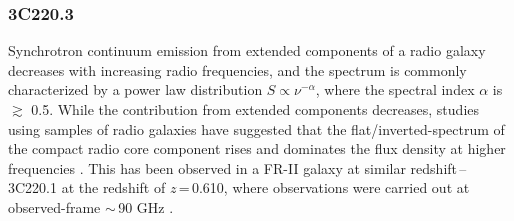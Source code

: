 \documentclass[twocolumn,apj,numberedappendix]{emulateapj}
\begin{document}
\subsubsection{3C220.3}\label{sec:SEDFg}
Synchrotron continuum emission from extended components of a radio galaxy decreases with increasing radio frequencies, 
and the spectrum is commonly characterized by a power law distribution $S \propto \nu^{-\alpha}$, where the 
spectral index $\alpha$ is $\gtrsim$ 0.5. While the contribution from extended components decreases, studies using 
samples of radio galaxies have suggested that the flat/inverted-spectrum of the compact radio core component rises 
and dominates the flux density at higher frequencies \citep{Kellermann81a,Begelman84a}. This has been observed in a FR-II galaxy at  similar redshift\,--\,3C220.1 at the redshift of $z$\,=\,0.610, where observations were carried out at observed-frame $\sim$\,90 GHz \citep{Hardcastle08a}. 
\end{document}
